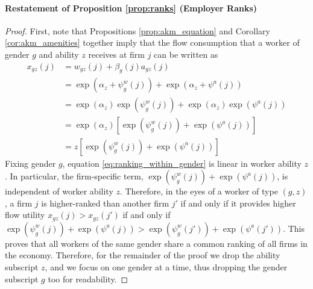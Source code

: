 \paragraph{Restatement of Proposition \ref{prop:ranks} (Employer Ranks)}

%
\emph{%
    \PropRanks%
}
%
\begin{proof}
    First, note that Propositions \ref{prop:akm_equation} and Corollary \ref{cor:akm_amenities} together imply that the flow consumption that a worker of gender $g$ and ability $z$ receives at firm $j$ can be written as
    \begin{align}
        x_{gz}(j) %
        &= w_{gz}(j) + \beta_{g}(j) a_{gz}(j) \\
        &= \exp\left( \alpha_{z} + \psi_{g}^{w}(j) \right)  +  \exp\left( \alpha_{z} + \psi^{a}(j) \right) \\
        &= \exp\left( \alpha_{z} \right) \exp\left( \psi_{g}^{w}(j) \right)  +  \exp\left( \alpha_{z} \right) \exp\left( \psi^{a}(j) \right) \\
        &= \exp\left( \alpha_{z} \right) \left[ \exp\left( \psi_{g}^{w}(j) \right)  +  \exp\left( \psi^{a}(j) \right) \right] \\
        &= z \left[ \exp\left( \psi_{g}^{w}(j) \right)  +  \exp\left( \psi^{a}(j) \right) \right] \label{eq:ranking_within_gender}
    \end{align}
    Fixing gender $g$, equation \eqref{eq:ranking_within_gender} is linear in worker ability $z$. In particular, the firm-specific term, $\exp( \psi_{g}^{w}(j) )  +  \exp( \psi^{a}(j) )$, is independent of worker ability $z$. Therefore, in the eyes of a worker of type $(g,z)$, a firm $j$ is higher-ranked than another firm $j'$ if and only if it provides higher flow utility $x_{gz}(j) > x_{gz}(j')$ if and only if $\exp( \psi_{g}^{w}(j) )  +  \exp( \psi^{a}(j) ) > \exp( \psi_{g}^{w}(j') )  +  \exp( \psi^{a}(j') )$. This proves that all workers of the same gender share a common ranking of all firms in the economy. Therefore, for the remainder of the proof we drop the ability subscript $z$, and we focus on one gender at a time, thus dropping the gender subscript $g$ too for readability.


\end{proof}
